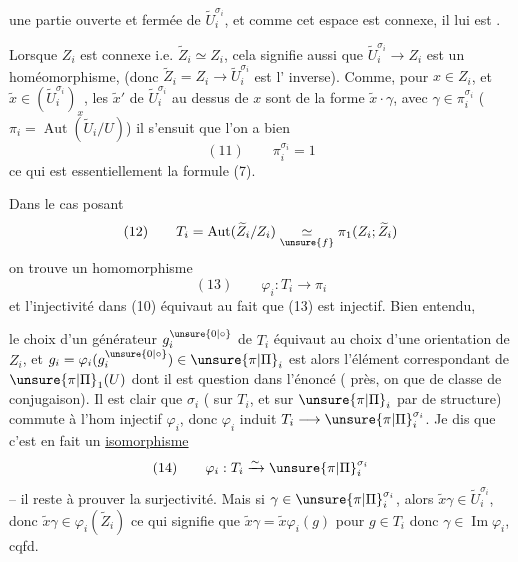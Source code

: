  une partie ouverte et fermée de
$\widetilde U_i^{\sigma_i}$, et comme cet espace est connexe,
il lui est .
\deleted{\[
(10)\qquad \widetilde U_i^{\sigma_i}=\operatorname{Im}(\widetilde Z_i\longrightarrow\widetilde U_i)
\]}

Lorsque $Z_i$ est  connexe i.e.
$\widetilde Z_i\simeq Z_i$, cela signifie aussi que
$\widetilde U_i^{\sigma_i}\longrightarrow Z_i$ est un homéomorphisme,
(donc $\widetilde Z_i=Z_i\longrightarrow\widetilde U_i^{\sigma_i}$ est l'
inverse). Comme, pour $x\in Z_i$,
 et $\widetilde x\in(\widetilde U_i^{\sigma_i})_x$, les
$\widetilde x'$ de $\widetilde U_i^{\sigma_i}$ au dessus de $x$ sont   de
la forme $\widetilde x\cdot\gamma$, avec $\gamma\in\pi_i^{\sigma_i}$
($\pi_i=\operatorname{Aut}(\widetilde U_i/U)$) il s'ensuit que l'on
a bien
\[
(11)\qquad \pi_i^{\sigma_i}=1
\]
ce qui est essentiellement la formule (7).

Dans le cas   posant
\[
(12)\qquad T_i=\operatorname{Aut}(\widetilde Z_i/Z_i)\underset{\unsure{f}}{\simeq}\pi_1(Z_i;\widetilde Z_i)
\]
on trouve un homomorphisme 
\[
(13)\qquad \varphi_i:T_i\longrightarrow\pi_i
\]
et l'injectivité dans (10) équivaut au fait
que (13) est injectif. Bien entendu,

le choix d'un générateur $g_i^{\unsure{0|\circ}}$ de $T_i$ équivaut au
choix d'une orientation de $Z_i$, et
$g_i=\varphi_i(g_i^{\unsure{0|\circ}})\in\unsure{\pi|\Pi}_i$ est alors l'élément correspondant
de $\unsure{\pi|\Pi}_1(U)$ dont il est question dans
l'énoncé ( près, on  que
de classe de conjugaison). Il est clair
que $\sigma_i$ (  sur $T_i$, et sur $\unsure{\pi|\Pi}_i$
par  de structure) commute à
l'hom injectif $\varphi_i$, donc  $\varphi_i$
induit  $T_i\longrightarrow\unsure{\pi|\Pi}_i^{\sigma_i}$. Je dis que
c'est en fait un \uline{isomorphisme}
\[
\text{(14)}\qquad \varphi_i:T_i\xrightarrow{\sim}\unsure{\pi|\Pi}_i^{\sigma_i}
\]
-- il reste à prouver la surjectivité. Mais
si $\gamma\in\unsure{\pi|\Pi}_i^{\sigma_i}$, alors $\widetilde{x}\gamma\in\widetilde{U}_i^{\sigma_i}$, donc
$\widetilde{x}\gamma\in\varphi_i(\widetilde{Z}_i)$ ce qui signifie que
$\widetilde{x}\gamma=\widetilde{x}\varphi_i(g)$  pour $g\in T_i$ donc
$\gamma\in\operatorname{Im}\varphi_i$, cqfd.

